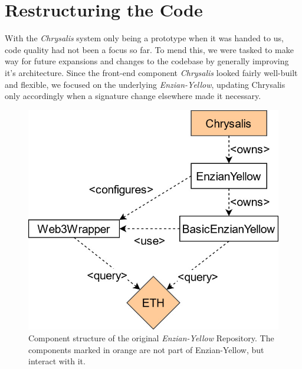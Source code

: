 %
\section{Restructuring the Code}
\label{sec:impr:enzian}

With the \emph{Chrysalis} system only being a prototype when it was handed to us, code quality had not been a focus so far. To mend this, we were tasked to make way for future expansions and changes to the codebase by generally improving it's architecture. \newline
Since the front-end component \emph{Chrysalis} looked fairly well-built and flexible, we focused on the underlying \emph{Enzian-Yellow}, updating Chrysalis only accordingly when a signature change elsewhere made it necessary.

\begin{figure}[h]
	\centering
	\captionsetup{justification=centering,margin=2cm}
	\includegraphics[height=0.5\textwidth]{gfx/enzian-original}
	\caption{Component structure of the original \emph{Enzian-Yellow} Repository. The components marked in orange are not part of Enzian-Yellow, but interact with it.}
	\label{fig:impr:enzian:original}
\end{figure}

